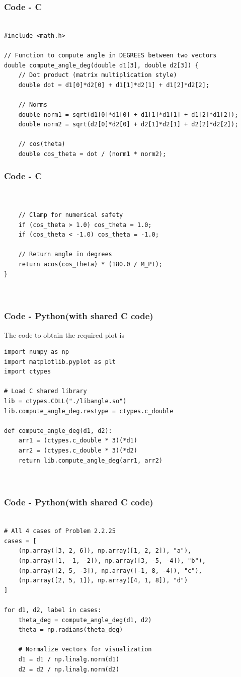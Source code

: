 \documentclass{beamer}
\theoremstyle{remark}
\numberwithin{equation}{section}
\begin{document}
\begin{frame}[fragile]
    \frametitle{Code - C}
    \begin{lstlisting}

#include <math.h>

// Function to compute angle in DEGREES between two vectors
double compute_angle_deg(double d1[3], double d2[3]) {
    // Dot product (matrix multiplication style)
    double dot = d1[0]*d2[0] + d1[1]*d2[1] + d1[2]*d2[2];

    // Norms
    double norm1 = sqrt(d1[0]*d1[0] + d1[1]*d1[1] + d1[2]*d1[2]);
    double norm2 = sqrt(d2[0]*d2[0] + d2[1]*d2[1] + d2[2]*d2[2]);

    // cos(theta)
    double cos_theta = dot / (norm1 * norm2);

\end{lstlisting}
\end{frame}

\begin{frame}[fragile]
    \frametitle{Code - C}
    \begin{lstlisting}


    // Clamp for numerical safety
    if (cos_theta > 1.0) cos_theta = 1.0;
    if (cos_theta < -1.0) cos_theta = -1.0;

    // Return angle in degrees
    return acos(cos_theta) * (180.0 / M_PI);
}



\end{lstlisting}
\end{frame}

\begin{frame}[fragile]
    \frametitle{Code - Python(with shared C code)}
    The code to obtain the required plot is
    \begin{lstlisting}
import numpy as np
import matplotlib.pyplot as plt
import ctypes

# Load C shared library
lib = ctypes.CDLL("./libangle.so")
lib.compute_angle_deg.restype = ctypes.c_double

def compute_angle_deg(d1, d2):
    arr1 = (ctypes.c_double * 3)(*d1)
    arr2 = (ctypes.c_double * 3)(*d2)
    return lib.compute_angle_deg(arr1, arr2)



\end{lstlisting}
\end{frame}
\begin{frame}[fragile]
\frametitle{Code - Python(with shared C code)}
\begin{lstlisting}

# All 4 cases of Problem 2.2.25
cases = [
    (np.array([3, 2, 6]), np.array([1, 2, 2]), "a"),
    (np.array([1, -1, -2]), np.array([3, -5, -4]), "b"),
    (np.array([2, 5, -3]), np.array([-1, 8, -4]), "c"),
    (np.array([2, 5, 1]), np.array([4, 1, 8]), "d")
]

for d1, d2, label in cases:
    theta_deg = compute_angle_deg(d1, d2)
    theta = np.radians(theta_deg)

    # Normalize vectors for visualization
    d1 = d1 / np.linalg.norm(d1)
    d2 = d2 / np.linalg.norm(d2)


\end{lstlisting}
\end{frame}
\end{document}
